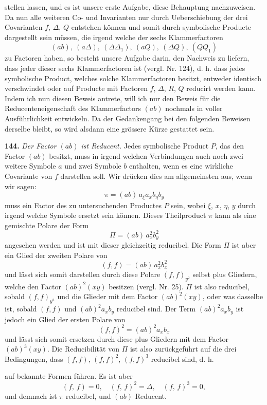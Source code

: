 stellen lassen, und es ist unsere erste Aufgabe, diese Behauptung nachzuweisen. Da nun alle weiteren Co- und Invarianten nur durch Ueberschiebung der drei Covarianten $f$, $\Delta$, $Q$ entstehen können und somit durch symbolische Producte dargestellt sein müssen, die irgend welche der sechs Klammerfactoren
\[
(ab),\ (a\Delta),\ (\Delta\Delta_1),\ (aQ),\ (\Delta Q),\ (QQ_1)
\]
zu Factoren haben, so besteht unsere Aufgabe darin, den Nachweis zu liefern, dass jeder dieser sechs Klammerfactoren  ist (vergl. Nr. 124), d. h. dass jedes symbolische Product, welches solche Klammerfactoren besitzt, entweder identisch verschwindet oder auf Producte mit Factoren $f$, $\Delta$, $R$, $Q$ reducirt werden kann. Indem ich nun diesen Beweis antrete, will ich nur den Beweis für die Reducenteneigenschaft des Klammerfactors $(ab)$ nochmals in voller Ausführlichkeit entwickeln. Da der Gedankengang bei den folgenden Beweisen derselbe bleibt, so wird alsdann eine grössere Kürze gestattet sein.

\textbf{144.} \textit{Der Factor $(ab)$ ist Reducent.} Jedes symbolische Product $P$, das den Factor $(ab)$ besitzt, muss in irgend welchen Verbindungen auch noch zwei weitere Symbole $a$ und zwei Symbole $b$ enthalten, wenn es eine wirkliche Covariante von $f$ darstellen soll. Wir drücken dies am allgemeinsten aus, wenn wir sagen:
\[
\pi = (ab)\,a_\xi a_x b_\eta b_y
\]
muss ein Factor des zu untersuchenden Productes $P$ sein, wobei $\xi$, $x$, $\eta$, $y$ durch irgend welche Symbole ersetzt sein können. Dieses Theilproduct $\pi$ kann als eine gemischte Polare der Form
\[
\Pi = (ab)\,a_x^2 b_y^2
\]
angesehen werden und ist mit dieser gleichzeitig reducibel. Die Form $\Pi$ ist aber ein Glied der zweiten Polare von
\[
(f,f) = (ab)\,a_x^2 b_x^2
\]
und lässt sich somit darstellen durch diese Polare $(f,f)_{y^2}$ selbst plus Gliedern, welche den Factor $(ab)^2(xy)$ besitzen (vergl. Nr. 25). $\Pi$ ist also reducibel, sobald $(f,f)_{y^2}$ und  die Glieder mit dem Factor $(ab)^2(xy)$, oder was dasselbe ist, sobald $(f,f)$ und $(ab)^2a_xb_y$ reducibel sind. Der Term $(ab)^2a_xb_y$ ist jedoch ein Glied der ersten Polare von
\[
(f,f)^2 = (ab)^2a_xb_x
\]
und lässt sich somit ersetzen durch diese plus Gliedern mit dem Factor $(ab)^3(xy)$. Die Reducibilität von $\Pi$ ist also zurückgeführt auf die drei Bedingungen, dass $(f,f)$, $(f,f)^2$, $(f,f)^3$ reducibel sind, d. h.


auf bekannte Formen führen. Es ist aber
\[
(f,\,f) = 0, \quad (f,\,f)^2 = \Delta, \quad (f,\,f)^3 = 0,
\]
und demnach ist $\pi$ reducibel, und $(ab)$ Reducent.

